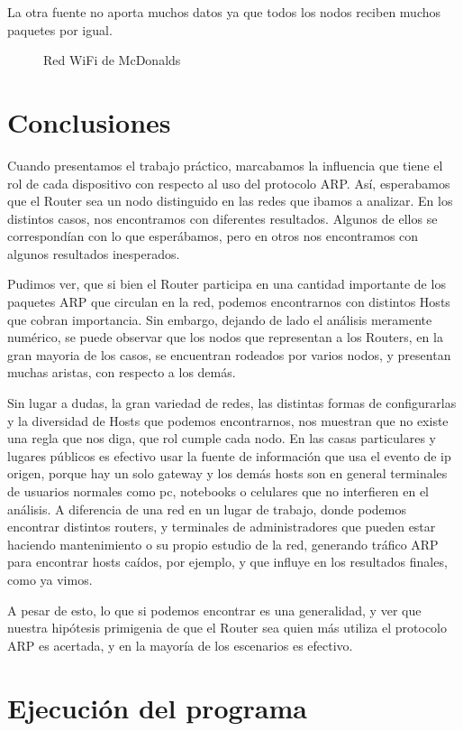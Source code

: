 \documentclass[a4paper, 11pt]{article}
\newcommand{\ponerGrafico}[4]
{\begin{figure}[H]
  \centering
  \subfloat{\hspace{-3.5cm}\texttt{[image: \#1]}}
  \caption{#2} \label{fig:#4}
\end{figure}
}
\begin{document}
La otra fuente no aporta muchos datos ya que todos los nodos reciben muchos paquetes por igual. 

\ponerGrafico{graficos/mcdonalds_grafo.png}{Red WiFi de McDonalds}{0.5}{label}

\section{Conclusiones}

Cuando presentamos el trabajo pr\'actico, marcabamos la influencia que tiene el rol de cada dispositivo con respecto al uso del protocolo ARP. As\'i, esperabamos que el Router sea un nodo distinguido en las redes que ibamos a analizar.
En los distintos casos, nos encontramos con diferentes resultados. Algunos de ellos se correspond\'ian con lo que esper\'abamos, pero en otros nos encontramos con algunos resultados inesperados.

Pudimos ver, que si bien el Router participa en una cantidad importante de los paquetes ARP que circulan en la red, podemos encontrarnos con distintos Hosts que cobran importancia. Sin embargo, dejando de lado el an\'alisis meramente num\'erico, se puede observar que los nodos que representan a los Routers, en la gran mayoria de los casos, se encuentran rodeados por varios nodos, y presentan muchas aristas, con respecto a los dem\'as.

Sin lugar a dudas, la gran variedad de redes, las distintas formas de configurarlas y la diversidad de Hosts que podemos encontrarnos, nos muestran que no existe una regla que nos diga, que rol cumple cada nodo. En las casas particulares y lugares p\'ublicos es efectivo usar la fuente de informaci\'on que usa el evento de ip origen, porque hay un solo gateway y los dem\'as hosts son en general terminales de usuarios normales como pc, notebooks o celulares que no interfieren en el an\'alisis. A diferencia de una red en un lugar de trabajo, donde podemos encontrar distintos routers, y terminales de administradores que pueden estar haciendo mantenimiento o su propio estudio de la red, generando tr\'afico ARP para encontrar hosts ca\'idos, por ejemplo, y que influye en los resultados finales, como ya vimos. 

A pesar de esto, lo que si podemos encontrar es una generalidad, y ver que nuestra hip\'otesis primigenia de que el Router sea quien m\'as utiliza el protocolo ARP es acertada, y en la mayor\'ia de los escenarios es efectivo.
\section{Ejecuci\'on del programa} 
\end{document}

